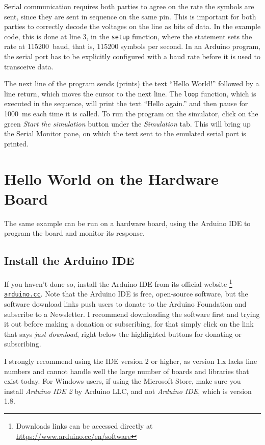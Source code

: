 Serial communication requires both parties to agree on the rate the symbols are sent, since they are sent in sequence on the same pin.
This is important for both parties to correctly decode the voltages on the line as bits of data.
In the example code, this is done at line 3, in the \texttt{setup} function, where the statement  sets the rate at \SI{115200}{baud}, that is, \num{115200} symbols per second.
In an Arduino program, the serial port has to be explicitly configured with a baud rate before it is used to transceive data.

The next line of the program sends (prints) the text ``Hello World!'' followed by a line return, which moves the cursor to the next line.
The \texttt{loop} function, which is executed in the sequence, will print the text ``Hello again.'' and then pause for \SI{1000}{ms} each time it is called.
To run the program on the simulator, click on the green \emph{Start the simulation} button under the \emph{Simulation} tab.
This will bring up the Serial Monitor pane, on which the text sent to the emulated serial port is printed.

\section{Hello World on the Hardware Board}

The same example can be run on a hardware board, using the Arduino IDE to program the board and monitor its response.

\subsection{Install the Arduino IDE}
If you haven't done so, install the Arduino IDE from its official website%
\footnote{Downloads links can be accessed directly at \url{https://www.arduino.cc/en/software}}
\texttt{\href{https://www.arduino.cc/en/software}{arduino.cc}}.
Note that the Arduino IDE is free, open-source software, but the software download links push users to donate to the Arduino Foundation and subscribe to a Newsletter.
I recommend downloading the software first and trying it out before making a donation or subscribing, for that simply click on the link that says \emph{just download}, right below the highlighted buttons for donating or subscribing.

I strongly recommend using the IDE version 2 or higher, as version 1.x lacks line numbers and cannot handle  well the large number of boards and libraries that exist today.
For Windows users, if using the Microsoft Store, make sure you install \emph{Arduino IDE 2} by Arduino LLC, and not \emph{Arduino IDE}, which is version 1.8.

